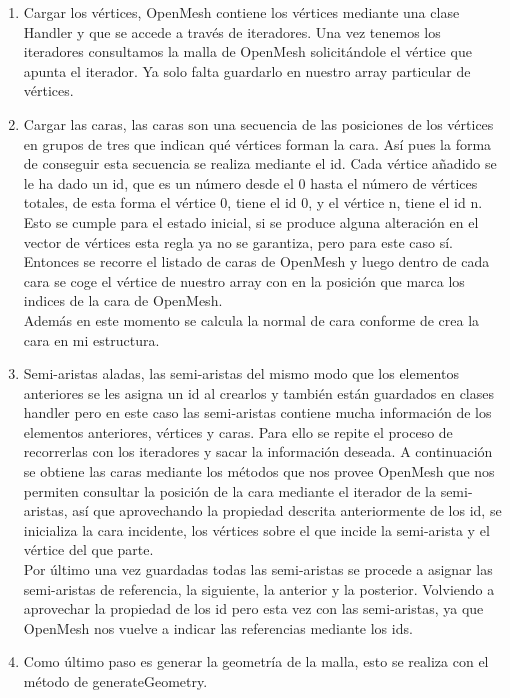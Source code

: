 \begin{enumerate}
	\item Cargar los vértices, OpenMesh contiene los vértices mediante una clase Handler y que se accede a través de iteradores. Una vez tenemos los iteradores consultamos la malla de OpenMesh solicitándole el vértice que apunta el iterador. Ya solo falta guardarlo en nuestro array particular de vértices.
	
	\item Cargar las caras, las caras son una secuencia de las posiciones de los vértices en grupos de tres que indican qué vértices forman la cara. Así pues la forma de conseguir esta secuencia se realiza mediante el id. Cada vértice añadido se le ha dado un id, que es un número desde el 0 hasta el número de vértices totales, de esta forma el vértice 0, tiene el id 0, y el vértice n, tiene el id n. Esto se cumple para el estado inicial, si se produce alguna alteración en el vector de vértices esta regla ya no se garantiza, pero para este caso sí. Entonces se recorre el listado de caras de OpenMesh y luego dentro de cada cara se coge el vértice de nuestro array con en la posición que marca los indices de la cara de OpenMesh.\\
	
	Además en este momento se calcula la normal de cara conforme de crea la cara en mi estructura.
	
	\item Semi-aristas aladas, las semi-aristas del mismo modo que los elementos anteriores se les asigna un id al crearlos y también están guardados en clases handler pero en este caso las semi-aristas contiene mucha información de los elementos anteriores, vértices y caras. Para ello se repite el proceso de recorrerlas con los iteradores y sacar la información deseada. A continuación se obtiene las caras mediante los métodos que nos provee OpenMesh que nos permiten consultar la posición de la cara mediante el iterador de la semi-aristas, así que aprovechando la propiedad descrita anteriormente de los id, se inicializa la cara incidente, los vértices sobre el que incide la semi-arista y el vértice del que parte.\\
	
	Por último una vez guardadas todas las semi-aristas se procede a asignar las semi-aristas de referencia, la siguiente, la anterior y la posterior. Volviendo a aprovechar la propiedad de los id pero esta vez con las semi-aristas, ya que OpenMesh nos vuelve a indicar las referencias mediante los ids.
	
	\item Como último paso es generar la geometría de la malla, esto se realiza con el método de generateGeometry.
	 
\end{enumerate}

